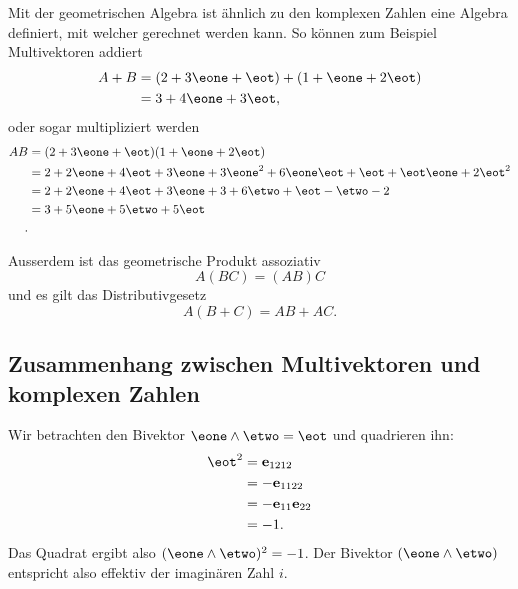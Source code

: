 Mit der geometrischen Algebra ist ähnlich zu den komplexen Zahlen eine Algebra definiert,
mit welcher gerechnet werden kann. So können zum Beispiel Multivektoren addiert
\begin{equation}
\begin{aligned}
A + B &= (2 + 3 \eone + \eot) + (1 + \eone + 2 \eot) \\
&= 3 + 4 \eone + 3 \eot,
\end{aligned}
\end{equation}
oder sogar multipliziert werden
\begin{equation}
\begin{aligned}
A  B &= (2 + 3 \eone + \eot) (1 + \eone + 2 \eot) \\
&= 2 + 2 \eone + 4 \eot + 3 \eone + 3 \eone^2 + 6 \eone \eot + \eot + \eot \eone + 2 \eot^2 \\
&= 2 + 2 \eone + 4 \eot + 3 \eone + 3 + 6 \etwo + \eot - \etwo - 2 \\
&= 3 + 5 \eone + 5 \etwo + 5 \eot \\.
\end{aligned}
\end{equation}

Ausserdem ist das geometrische Produkt assoziativ
\begin{equation}
A (B C) = (A B) C
\end{equation}
und es gilt das Distributivgesetz
\begin{equation}
  A (B + C) = AB + AC.
\end{equation}


\subsection{Zusammenhang zwischen Multivektoren und komplexen Zahlen}
Wir betrachten den Bivektor $\eone \wedge \etwo = \eot$ und quadrieren ihn:
\begin{equation}
  \begin{aligned}
    \eot^2 &= \mathbf{e}_{1212} \\
    &= -\mathbf{e}_{1122} \\
    &= -\mathbf{e}_{11} \mathbf{e}_{22} \\
    &= -1.
  \end{aligned}
\end{equation}
\newcommand\equalhat{\mathrel{\stackon[1.5pt]{=}{\stretchto{%
    \scalerel*[\widthof{=}]{\wedge}{\rule{1ex}{3ex}}}{0.5ex}}}}
Das Quadrat ergibt also $(\eone \wedge \etwo)^2 = -1$. Der Bivektor
$(\eone \wedge \etwo)$ entspricht also effektiv der imaginären Zahl $i$.

